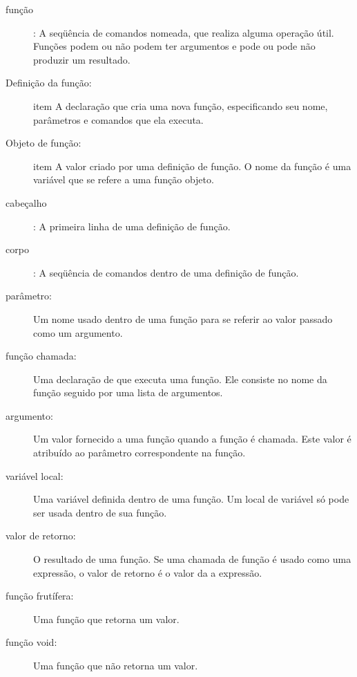 \documentclass[10pt]{book}
\begin{document}
\begin{description}

\item[função]: A seqüência de comandos nomeada, que realiza alguma
operação útil. Funções podem ou não podem ter argumentos e pode ou
pode não produzir um resultado.

\item[Definição da função:] item A declaração que cria uma nova função,
especificando seu nome, parâmetros e comandos que ela executa.

\item[Objeto de função:] item A valor criado por uma definição de função.
O nome da função é uma variável que se refere a uma função
objeto.

\item[cabeçalho]: A primeira linha de uma definição de função.

\item[corpo]: A seqüência de comandos dentro de uma definição de função.

\item[parâmetro:] Um nome usado dentro de uma função para se referir ao valor
passado como um argumento.

\item[função chamada:] Uma declaração de que executa uma função. Ele
consiste no nome da função seguido por uma lista de argumentos.

\item[argumento:] Um valor fornecido a uma função quando a função é chamada.
Este valor é atribuído ao parâmetro correspondente na função.

\item[variável local:] Uma variável definida dentro de uma função. Um local de
variável só pode ser usada dentro de sua função.

\item[valor de retorno:] O resultado de uma função. Se uma chamada de função
é usado como uma expressão, o valor de retorno é o valor da
a expressão.

\item[função frutífera:] Uma função que retorna um valor.

\item[função void:] Uma função que não retorna um valor.


\end{description}
\end{document}
